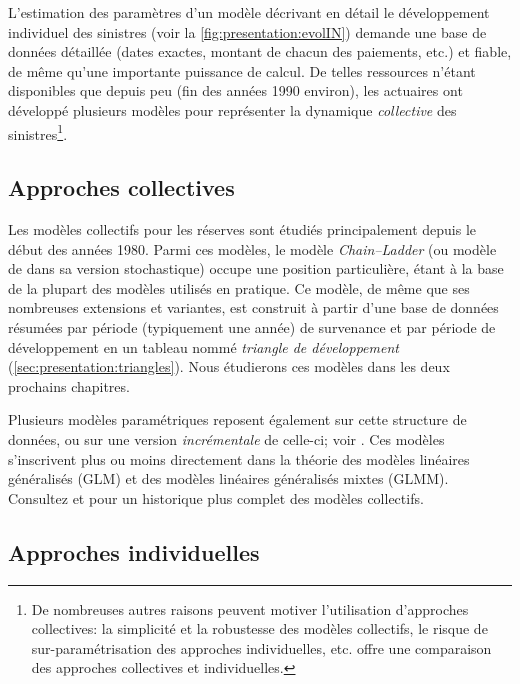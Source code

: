 L'estimation des paramètres d'un modèle décrivant en détail le
développement individuel des sinistres (voir la
\autoref{fig:presentation:evolIN}) demande une base de données
détaillée (dates exactes, montant de chacun des paiements, etc.) et
fiable, de même qu'une importante puissance de calcul. De telles
ressources n'étant disponibles que depuis peu (fin des années 1990
environ), les actuaires ont développé plusieurs modèles pour
représenter la dynamique \emph{collective} des sinistres\footnote{%
  De nombreuses autres raisons peuvent motiver l'utilisation
  d'approches collectives: la simplicité et la robustesse des modèles
  collectifs, le risque de sur-paramétrisation des approches
  individuelles, etc. \citet{Jin2014} offre une comparaison des
  approches collectives et individuelles.}. %

\subsection{Approches collectives}
\label{sec:presentation:approches:collectives}

Les modèles collectifs pour les réserves sont étudiés principalement
depuis le début des années 1980. Parmi ces modèles, le modèle
\emph{Chain--Ladder} (ou modèle de \citet{Mack93} dans sa version
stochastique) occupe une position particulière, étant à la base de la
plupart des modèles utilisés en pratique. Ce modèle, de même que ses
nombreuses extensions et variantes, est construit à partir d'une base
de données résumées par période (typiquement une année) de survenance
et par période de développement en un tableau nommé \emph{triangle de
  développement} (\autoref{sec:presentation:triangles}). Nous
étudierons ces modèles dans les deux prochains chapitres.

Plusieurs modèles paramétriques reposent également sur cette structure
de données, ou sur une version \emph{incrémentale} de celle-ci; voir
\citet{Hertig,RV98,EV2005,Taylorbook}. Ces modèles s'inscrivent plus
ou moins directement dans la théorie des modèles linéaires généralisés
(GLM) et des modèles linéaires généralisés mixtes (GLMM). Consultez
\citet{WuthrichBook} et \citet{Engl02} pour un historique plus complet
des modèles collectifs.

\subsection{Approches individuelles}
\label{sec:presentation:approches:individuelles}

